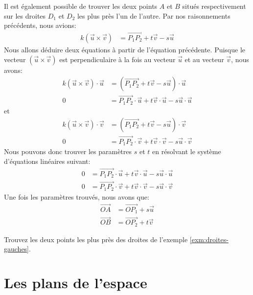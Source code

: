 \documentclass[]{book}
\theoremstyle{definition}
\theoremstyle{definition}
\theoremstyle{definition}
\theoremstyle{remark}
\let\BeginKnitrBlock\begin \let\EndKnitrBlock\end
\begin{document}
Il est également possible de trouver les deux points \(A\) et \(B\) situés respectivement sur les droites \(D_1\) et \(D_2\) les plus près l'un de l'autre. Par nos raisonnements précédents, nous avions:
\begin{align*}
k(\vec u \times \vec v) &= \overrightarrow{P_1P_2} +t\vec v - s\vec u
\end{align*}
Nous allons déduire deux équations à partir de l'équation précédente. Puisque le vecteur \((\vec u \times \vec v)\) est perpendiculaire à la fois au vecteur \(\vec u\) et au vecteur \(\vec v\), nous avons:
\begin{align*}
k(\vec u \times \vec v) \cdot \vec u &= (\overrightarrow{P_1P_2} +t\vec v - s\vec u)\cdot \vec u \\
0 &= \overrightarrow{P_1P_2}\cdot \vec u +t\vec v \cdot \vec u - s\vec u \cdot \vec u
\end{align*}
et
\begin{align*}
k(\vec u \times \vec v) \cdot \vec v &= (\overrightarrow{P_1P_2} +t\vec v - s\vec u)\cdot \vec v \\
0 &= \overrightarrow{P_1P_2}\cdot \vec v +t\vec v \cdot \vec v - s\vec u \cdot \vec v
\end{align*}
Nous pouvons donc trouver les paramètres \(s\) et \(t\) en résolvant le système d'équations linéaires suivant:
\begin{align*}
0 &= \overrightarrow{P_1P_2}\cdot \vec u +t\vec v \cdot \vec u - s\vec u \cdot \vec u \\
0 &= \overrightarrow{P_1P_2}\cdot \vec v +t\vec v \cdot \vec v - s\vec u \cdot \vec v
\end{align*}
Une fois les paramètres trouvés, nous avons que:
\begin{align*}
\overrightarrow{OA} &= \overrightarrow{OP_1} + s\vec u \\
\overrightarrow{OB} &= \overrightarrow{OP_2} + t\vec v
\end{align*}

\BeginKnitrBlock{example}
\protect\hypertarget{exm:unnamed-chunk-215}{}{\label{exm:unnamed-chunk-215} }Trouvez les deux points les plus près des droites de l'exemple \ref{exm:droites-gauches}.
\EndKnitrBlock{example}

\hypertarget{les-plans-de-lespace}{%
\section{Les plans de l'espace}\label{les-plans-de-lespace}}
\end{document}

